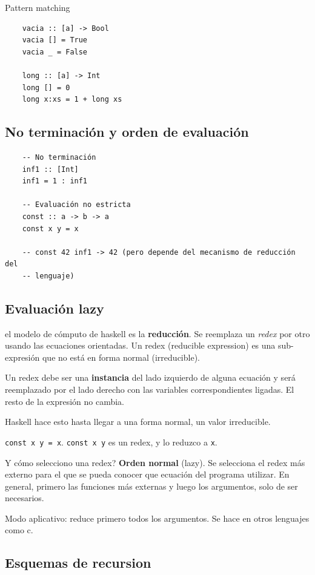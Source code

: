 \documentclass{report}
\theoremstyle{definition} %
\begin{document}
Pattern matching

\begin{verbatim}
    vacia :: [a] -> Bool
    vacia [] = True
    vacia _ = False

    long :: [a] -> Int
    long [] = 0
    long x:xs = 1 + long xs
\end{verbatim}

\subsection{No terminación y orden de evaluación}

\begin{verbatim}
    -- No terminación
    inf1 :: [Int]
    inf1 = 1 : inf1

    -- Evaluación no estricta
    const :: a -> b -> a
    const x y = x

    -- const 42 inf1 -> 42 (pero depende del mecanismo de reducción del
    -- lenguaje)
\end{verbatim}

\subsection{Evaluación lazy}

el modelo de cómputo de haskell es la \textbf{reducción}. Se reemplaza un
\textit{redex} por otro usando las ecuaciones orientadas. Un redex (reducible
expression) es una sub-expresión que no está en forma normal (irreducible).

Un redex debe ser una \textbf{instancia} del lado izquierdo de alguna ecuación y
será reemplazado por el lado derecho con las variables correspondientes ligadas.
El resto de la expresión no cambia.

Haskell hace esto hasta llegar a una forma normal, un valor irreducible.

\texttt{const x y = x}. \texttt{const x y} es un redex, y lo reduzco a
\texttt{x}.

Y cómo selecciono una redex? \textbf{Orden normal} (lazy). Se selecciona el
redex más externo para el que se pueda conocer que ecuación del programa
utilizar. En general, primero las funciones más externas y luego los argumentos,
solo de ser necesarios.

Modo aplicativo: reduce primero todos los argumentos. Se hace en otros lenguajes
como c.

\subsection{Esquemas de recursion}
\end{document}
